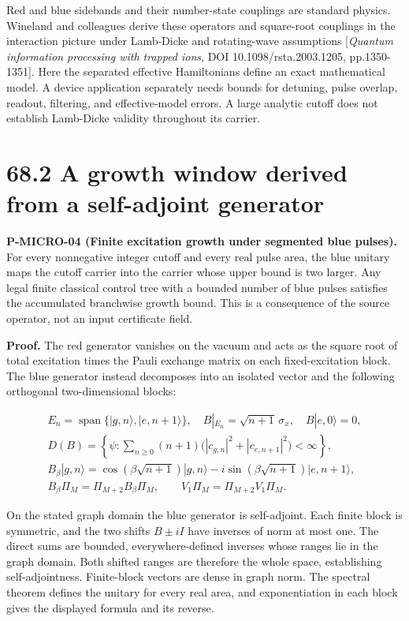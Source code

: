 \documentclass[
  11pt,
  oneside]{book}
\begin{document}
Red and blue sidebands and their number-state couplings are standard
physics. Wineland and colleagues derive these operators and square-root
couplings in the interaction picture under Lamb-Dicke and rotating-wave
assumptions {[}\emph{Quantum information processing with trapped ions},
DOI 10.1098/rsta.2003.1205, pp.1350-1351{]}. Here the separated
effective Hamiltonians define an exact mathematical model. A device
application separately needs bounds for detuning, pulse overlap,
readout, filtering, and effective-model errors. A large analytic cutoff
does not establish Lamb-Dicke validity throughout its carrier.

\section{68.2 A growth window derived from a self-adjoint generator}

\label{p-micro-04}{}

\textbf{P-MICRO-04 (Finite excitation growth under segmented blue
pulses).} For every nonnegative integer cutoff and every real pulse
area, the blue unitary maps the cutoff carrier into the carrier whose
upper bound is two larger. Any legal finite classical control tree with
a bounded number of blue pulses satisfies the accumulated branchwise
growth bound. This is a consequence of the source operator, not an input
certificate field.

\textbf{Proof.} The red generator vanishes on the vacuum and acts as the
square root of total excitation times the Pauli exchange matrix on each
fixed-excitation block. The blue generator instead decomposes into an
isolated vector and the following orthogonal two-dimensional blocks:

\[
\begin{gathered}
E_n=\operatorname{span}\{|g,n\rangle,|e,n+1\rangle\},\quad
B|_{E_n}=\sqrt{n+1}\,\sigma_x,\quad B|e,0\rangle=0,\\
D(B)=\left\{\psi:\sum_{n\ge0}(n+1)
\bigl(|c_{g,n}|^2+|c_{e,n+1}|^2\bigr)<\infty\right\},\\
B_\beta|g,n\rangle=
\cos(\beta\sqrt{n+1})|g,n\rangle
-i\sin(\beta\sqrt{n+1})|e,n+1\rangle,\\
B_\beta\Pi_M=\Pi_{M+2}B_\beta\Pi_M,\qquad
V_1\Pi_M=\Pi_{M+2}V_1\Pi_M.
\end{gathered}
\]

On the stated graph domain the blue generator is self-adjoint. Each
finite block is symmetric, and the two shifts \(B± iI\) have inverses of
norm at most one. The direct sums are bounded, everywhere-defined
inverses whose ranges lie in the graph domain. Both shifted ranges are
therefore the whole space, establishing self-adjointness. Finite-block
vectors are dense in graph norm. The spectral theorem defines the
unitary for every real area, and exponentiation in each block gives the
displayed formula and its reverse.
\end{document}
